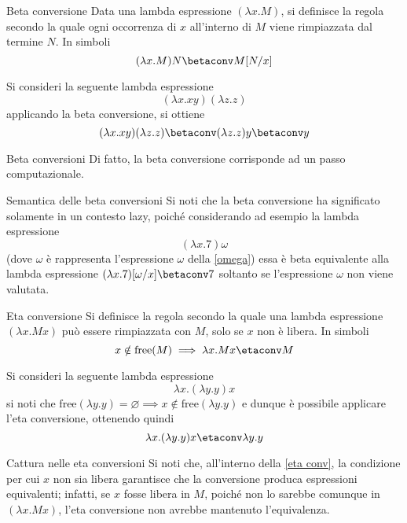 \documentclass[a4paper, 12pt]{report}
\begin{document}
    \begin{frameddefn}{Beta conversione}
        Data una lambda espressione $(\lambda x.M)$, si definisce  la regola secondo la quale ogni occorrenza di $x$ all'interno di $M$ viene rimpiazzata dal termine $N$. In simboli $$(\lambda x.M)N \betaconv M[N/x]$$
    \end{frameddefn}

    \begin{example}
        Si consideri la seguente lambda espressione $$(\lambda x.xy)(\lambda z.z)$$ applicando la beta conversione, si ottiene $$(\lambda x.xy)(\lambda z.z) \betaconv (\lambda z.z)y \betaconv y$$
    \end{example}

    \begin{framedobs}{Beta conversioni}
        Di fatto, la beta conversione corrisponde ad un passo computazionale.
    \end{framedobs}

    \begin{framedobs}{Semantica delle beta conversioni}
        Si noti che la beta conversione ha significato solamente in un contesto lazy, poiché considerando ad esempio la lambda espressione $$(\lambda x.7) \omega$$ (dove $\omega$ è rappresenta l'espressione $\omega$ della \cref{omega}) essa è beta equivalente alla lambda espressione $(\lambda x.7)[\omega/x] \betaconv 7$ soltanto se l'espressione $\omega$ non viene valutata.
    \end{framedobs}

    \begin{frameddefn}[label={eta conv}]{Eta conversione}
        Si definisce  la regola secondo la quale una lambda espressione $(\lambda x.Mx)$ può essere rimpiazzata con $M$, solo se $x$ non è libera. In simboli $$x \notin \mathrm{free}(M) \implies \lambda x.Mx \etaconv M$$
    \end{frameddefn}

    \begin{example}
        Si consideri la seguente lambda espressione $$\lambda x.(\lambda y.y)x$$ si noti che $\mathrm{free}(\lambda y.y) = \varnothing \implies x \notin \mathrm{free}(\lambda y.y)$ e dunque è possibile applicare l'eta conversione, ottenendo quindi $$\lambda x .(\lambda y.y) x \etaconv \lambda y.y$$
    \end{example}

    \begin{framedobs}{Cattura nelle eta conversioni}
        Si noti che, all'interno della \cref{eta conv}, la condizione per cui $x$ non sia libera garantisce che la conversione produca espressioni equivalenti; infatti, se $x$ fosse libera in $M$, poiché non lo sarebbe comunque in $(\lambda x.Mx)$, l'eta conversione non avrebbe mantenuto l'equivalenza.
    \end{framedobs}
\end{document}
